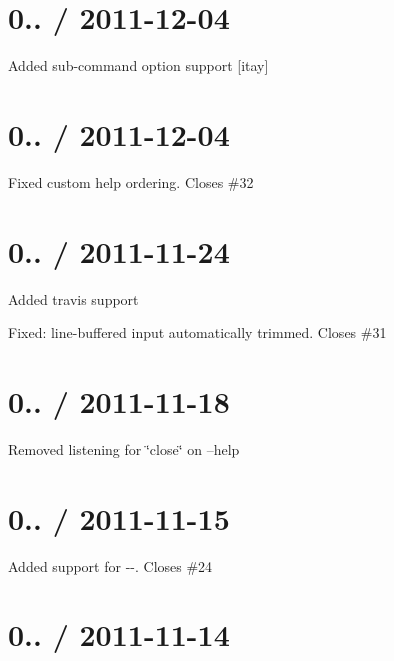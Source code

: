 \section*{0.. / 2011-\/12-\/04 }


\begin{DoxyItemize}
\item Added sub-\/command option support \mbox{[}itay\mbox{]}
\end{DoxyItemize}

\section*{0.. / 2011-\/12-\/04 }


\begin{DoxyItemize}
\item Fixed custom help ordering. Closes \#32
\end{DoxyItemize}

\section*{0.. / 2011-\/11-\/24 }


\begin{DoxyItemize}
\item Added travis support
\item Fixed\+: line-\/buffered input automatically trimmed. Closes \#31
\end{DoxyItemize}

\section*{0.. / 2011-\/11-\/18 }


\begin{DoxyItemize}
\item Removed listening for \char`\"{}close\char`\"{} on --help
\end{DoxyItemize}

\section*{0.. / 2011-\/11-\/15 }


\begin{DoxyItemize}
\item Added support for {\ttfamily -\/-\/}. Closes \#24
\end{DoxyItemize}

\section*{0.. / 2011-\/11-\/14 }


